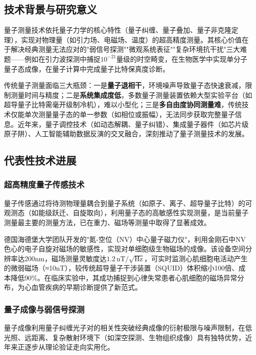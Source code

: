 \documentclass[lettersize,journal]{IEEEtran}
\begin{document}
	\subsection{技术背景与研究意义}
	量子测量技术依托量子力学的核心特性（量子纠缠、量子叠加、量子非克隆定理），实现对物理量（如引力场、电磁场、温度）的超高精度测量。其核心价值在于解决经典测量无法应对的"弱信号探测""微观系统表征""复杂环境抗干扰"三大难题——例如在引力波探测中捕捉$10^{-21}$量级的时空畸变，在生物医学中实现单分子量子态成像，在量子计算中完成量子比特保真度诊断。
	
	传统量子测量面临三大瓶颈：一是\textbf{量子退相干}，环境噪声导致量子态快速衰减，限制测量时间与精度；二是\textbf{系统集成度低}，多数量子测量装置依赖大型实验平台（如超导量子比特需毫开级制冷机），难以小型化；三是\textbf{多自由度协同测量难}，传统技术仅能单次测量量子态的单一参数（如相位或振幅），无法同步获取完整量子信息。近年来，量子调控技术（如动态解耦、量子纠错）、集成量子器件（如芯片级原子阱）、人工智能辅助数据反演的交叉融合，深刻推动了量子测量技术的发展。
	
	\subsection{代表性技术进展}
	
	\subsubsection{超高精度量子传感技术}
	量子传感通过将待测物理量耦合到量子系统（如原子、离子、超导量子比特）的可观测态（如能级跃迁、自旋取向），利用量子态的高敏感性实现测量，是当前量子测量最主要的测量方法，已在重力、磁场等测量中取得了显著成效。
	
	德国海德堡大学团队开发的"氮-空位（NV）中心量子磁力仪"，利用金刚石中NV色心的电子自旋对磁场的敏感性，实现对单细胞级生物磁场的成像\cite{heidelberg2024nv_magnetometer}。该设备空间分辨率达200nm，磁场测量灵敏度达$1.2\,\text{nT}/\sqrt{\text{Hz}}$，可实时监测心肌细胞电活动产生的微弱磁场（≈10nT），较传统超导量子干涉装置（SQUID）体积缩小100倍、成本降低90\%。在临床实验中，其成功捕捉到心律失常患者心肌细胞的磁场异常分布，为心血管疾病的早期诊断提供了新范式。
	
	\subsubsection{量子成像与弱信号探测}
	量子成像利用量子纠缠光子对的相关性突破经典成像的衍射极限与噪声限制，在低光照、远距离、复杂散射环境下（如深空探测、生物组织成像）具有独特优势，近年来正逐步从理论验证走向实用化。
	
\end{document}
